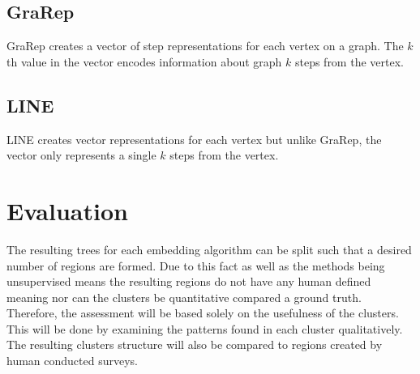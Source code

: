 \documentclass[journal,compsoc]{IEEEtran}
\begin{document}
\subsection{GraRep \cite{Cao2015GraRepLG}}
GraRep creates a vector of step representations for each vertex on a graph. The ${k}$th value in the vector encodes information about graph ${k}$ steps from the vertex.

\subsection{LINE \cite{Tang2015LINELI}}
LINE creates vector representations for each vertex but unlike GraRep, the vector only represents a single  ${k}$ steps from the vertex.


\section{Evaluation}
The resulting trees for each embedding algorithm can be split such that a desired number of regions are formed. Due to this fact as well as the methods being unsupervised means the resulting regions do not have any human defined meaning nor can the clusters be quantitative compared a ground truth. Therefore, the assessment will be based solely on the usefulness of the clusters. This will be done by examining the patterns found in each cluster qualitatively. The resulting clusters structure will also be compared to regions created by human conducted surveys.




	
	
\end{document}
